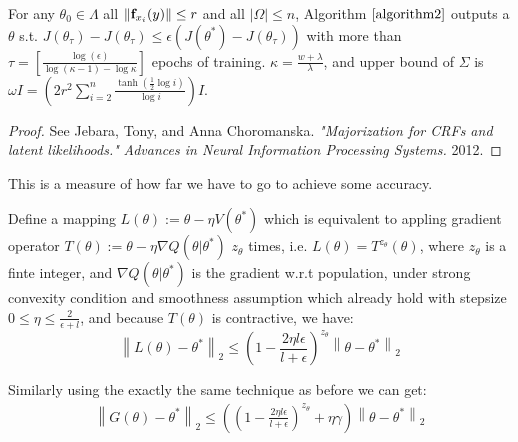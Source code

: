\documentclass{beamer}
\begin{document}
  \begin{frame}
    
   
      \begin{theorem}
       For any $\theta_0 \in \Lambda$ all $\left\lVert {\bf f}_{x_i}(y)  \right \lVert \leq r$ and all $|\Omega | \leq n$, Algorithm $\ref{algorithm2}$
       outputs a $\theta$ s.t. $J(\theta_{\tau}) - J(\theta_{\tau}) \leq \epsilon(J(\theta^*) - J(\theta_{\tau}))$ with more than $\tau = [\frac{\log(\epsilon)}{\log(\kappa-1) - \log \kappa}]$ epochs
       of training. $\kappa = \frac{w + \lambda}{\lambda}$, and upper bound of $\Sigma$ is $\omega I = (2 r^2 \sum_{i=2}^{n} \frac{\tanh(\frac{1}{2}\log i)}{\log i} )I$.
      \end{theorem}
    
   
    \begin{proof}
      See Jebara, Tony, and Anna Choromanska. {\it"Majorization for CRFs and latent likelihoods."}
      {\it Advances in Neural Information Processing Systems.} 2012.
     
        \end{proof}
 This is a measure of how far we have to go to achieve some accuracy.
    \end{frame}


\begin{frame}
  \begin{lemma}
    Define a mapping $L(\theta) := \theta - \eta V(\theta^*) $ which is equivalent to appling gradient operator $T(\theta):= \theta - \eta \nabla Q(\theta|\theta^*)$ $z_{\theta}$ times, i.e. $L(\theta) = T^{z_{\theta}}(\theta)$, where $z_{\theta}$ is a finte integer, and $\nabla Q(\theta|\theta^*)$  is the gradient w.r.t population, under strong
    convexity condition and smoothness assumption which already hold with stepsize $0 \leq \eta \leq \frac{2}{\epsilon+l}$, and because $T(\theta)$ is contractive, we have:
    \begin{equation}
      \left\lVert L(\theta) - \theta^* \right\lVert_2 \leq (1 - \frac{2\eta l \epsilon}{l+ \epsilon})^{z_{\theta}}\left\lVert \theta - \theta^* \right\lVert_2
    \label{contraction}
    \end{equation} 
    \label{contractive3}
  \end{lemma}
  Similarly using the exactly the same technique as before we can get:
\begin{equation}
  \begin{aligned}
    \left\lVert G(\theta) - \theta^* \right\lVert_2  \leq ((1 - \frac{2\eta l \epsilon}{l+ \epsilon})^{z_{\theta}} + \eta \gamma)\left\lVert \theta - \theta^* \right\lVert_2
  \end{aligned}
 \end{equation}
\end{frame}
    
\end{document}
